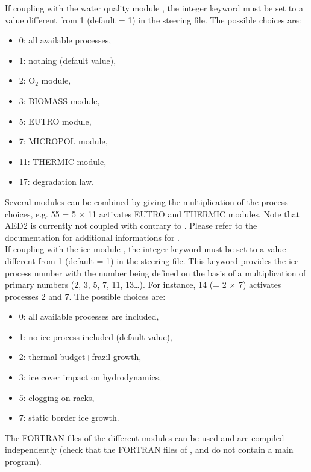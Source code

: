 If coupling with the water quality module \waqtel, the integer keyword
 must be set to a value different from 1
(default = 1) in the  steering file.
The possible choices are:
\begin{itemize}
\item 0: all available processes,
\item 1: nothing (default value),
\item 2: O$_2$ module,
\item 3: BIOMASS module,
\item 5: EUTRO module,
\item 7: MICROPOL module,
\item 11: THERMIC module,
\item 17: degradation law.
\end{itemize}

Several modules can be combined by giving the multiplication of the process
choices, e.g. 55 = 5 $\times$ 11 activates EUTRO and THERMIC modules.
Note that AED2 is currently not coupled with  contrary to
.
Please refer to the \waqtel documentation for additional informations for
\waqtel.\\

If coupling with the ice module \khione, the integer keyword
 must be set to a value different from 1
(default = 1) in the  steering file.
This keyword provides the ice process number with the number being defined on
the basis of a multiplication of primary numbers (2, 3, 5, 7, 11, 13\ldots).
For instance, 14 (= 2 $\times$ 7) activates processes 2 and 7.
The possible choices are:
\begin{itemize}
\item 0: all available processes are included,
\item 1: no ice process included (default value),
\item 2: thermal budget+frazil growth,
\item 3: ice cover impact on hydrodynamics,
\item 5: clogging on racks,
\item 7: static border ice growth.
\end{itemize}

The FORTRAN files of the different modules can be used and are compiled
independently (check that the FORTRAN files of \gaia, \sisyphe and \tomawac
do not contain a main program).\\

